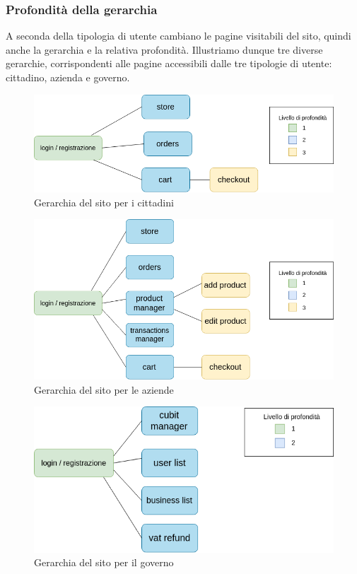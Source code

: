 
\subsubsection{Profondità della gerarchia}
A seconda della tipologia di utente cambiano le pagine visitabili del sito, quindi anche la gerarchia e la relativa profondità. Illustriamo dunque tre diverse gerarchie, corrispondenti alle pagine accessibili dalle tre tipologie di utente: cittadino, azienda e governo.

\begin{figure}[H]
	\includegraphics[scale=0.6]{res/images/RA/profondita0}
	\caption{Gerarchia del sito per i cittadini}
\end{figure}

\begin{figure}[H]
	\includegraphics[scale=0.6]{res/images/RA/profondita1}
	\caption{Gerarchia del sito per le aziende}
\end{figure}

\begin{figure}[H]
	\includegraphics[scale=0.6]{res/images/RA/profondita2}		\caption{Gerarchia del sito per il governo}
\end{figure}

